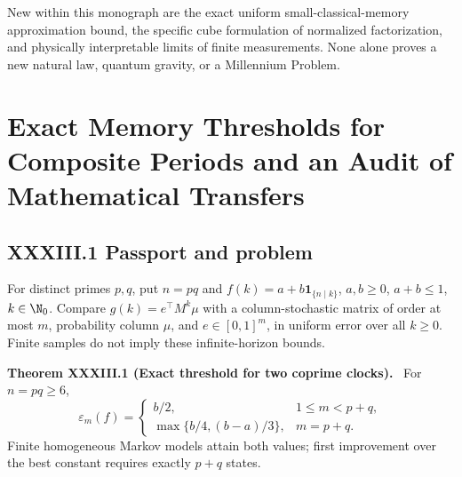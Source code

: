 \documentclass[11pt,a4paper,oneside]{book}
\newcommand{\one}{\mathbf 1}\newcommand{\ii}{\mathrm i}\newcommand{\dd}{\mathrm d}
\newcommand{\statement}[3]{\par\medskip\noindent\textbf{#1 #2 (#3).}\ }
\begin{document}
New within this monograph are the exact uniform small-classical-memory approximation bound, the specific cube formulation of normalized factorization, and physically interpretable limits of finite measurements. None alone proves a new natural law, quantum gravity, or a Millennium Problem.
\chapter{Exact Memory Thresholds for Composite Periods and an Audit of Mathematical Transfers}
\section*{XXXIII.1 Passport and problem}
For distinct primes $p,q$, put $n=pq$ and $f(k)=a+b\one_{\{n\mid k\}}$, $a,b\ge0$, $a+b\le1$, $k\in\N_0$. Compare $g(k)=e^\top M^k\mu$ with a column-stochastic matrix of order at most $m$, probability column $\mu$, and $e\in[0,1]^m$, in uniform error over all $k\ge0$. Finite samples do not imply these infinite-horizon bounds.
\statement{Theorem}{XXXIII.1}{Exact threshold for two coprime clocks} For $n=pq\ge6$,
\begin{equation}\varepsilon_m(f)=\begin{cases}b/2,&1\le m<p+q,\\\max\{b/4,(b-a)/3\},&m=p+q.\end{cases}\tag{120}\end{equation}
Finite homogeneous Markov models attain both values; first improvement over the best constant requires exactly $p+q$ states.
\end{document}
